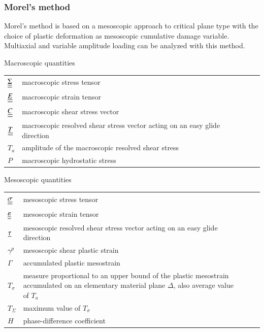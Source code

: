 \documentclass[3p,times,procedia,number]{elsarticle}
\begin{document}
\subsubsection{Morel's method}
Morel's method\cite{Morel2000101} is based on a mesoscopic approach to critical plane type with the
choice of plastic deformation as mesoscopic cumulative damage variable.  Multiaxial and variable amplitude loading can be analyzed with this method.
\begin{flushleft}
Macroscopic quantities
\begin{table}[!h]
	\begin{tabular}{lllll}
		$\uline{\uline{\Sigma}}$ & macroscopic stress tensor &  &  &  \\
		$\uline{\uline{E}}$ & macroscopic strain tensor &  &  &  \\
		$\uline{\uline{C}}$ & macroscopic shear stress vector  &  &  &  \\
		$\uline{\uline{T}}$ & macroscopic resolved shear stress vector acting on an easy glide direction&  &  &  \\
		$T_a$ & amplitude of the macroscopic resolved shear stress  &  &  &  \\	
		$P$ & macroscopic hydrostatic stress &  &  &  \\	
	\end{tabular}
\end{table}

Mesoscopic quantities
\begin{table}[!h]
	\begin{tabular}{lllll}
		$\uline{\uline{\sigma}}$& mesoscopic stress tensor &  &  &  \\
		$\uline{\uline{\varepsilon}}$ & mesoscopic strain tensor &  &  &  \\
		$\uline{\tau}$& mesoscopic resolved shear stress vector acting on an easy glide direction &  &  &  \\
		$\gamma^p$& mesoscopic shear plastic strain &  &  &  \\
		$\Gamma$ & accumulated plastic mesostrain &  &  &  \\
		$T_\sigma$ & measure proportional to an upper bound of the plastic mesostrain accumulated on an elementary
		material plane $\Delta$, also average value of $T_a$ &  &  &  \\
		$T_\Sigma$ & maximum value of  $T_\sigma$&  &  &  \\
		$H$ & phase-difference coefficient&  &  &  \\
	\end{tabular}
\end{table}
\end{flushleft}
\end{document}
